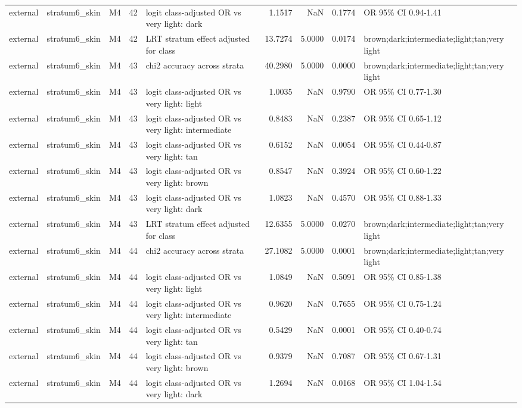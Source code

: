 \begin{tabular}{lllrlrrrl}
external & stratum6\_skin & M4 & 42 & logit class-adjusted OR vs very light: dark & 1.1517 & NaN & 0.1774 & OR 95\% CI 0.94-1.41 \\
external & stratum6\_skin & M4 & 42 & LRT stratum effect adjusted for class & 13.7274 & 5.0000 & 0.0174 & brown;dark;intermediate;light;tan;very light \\
external & stratum6\_skin & M4 & 43 & chi2 accuracy across strata & 40.2980 & 5.0000 & 0.0000 & brown;dark;intermediate;light;tan;very light \\
external & stratum6\_skin & M4 & 43 & logit class-adjusted OR vs very light: light & 1.0035 & NaN & 0.9790 & OR 95\% CI 0.77-1.30 \\
external & stratum6\_skin & M4 & 43 & logit class-adjusted OR vs very light: intermediate & 0.8483 & NaN & 0.2387 & OR 95\% CI 0.65-1.12 \\
external & stratum6\_skin & M4 & 43 & logit class-adjusted OR vs very light: tan & 0.6152 & NaN & 0.0054 & OR 95\% CI 0.44-0.87 \\
external & stratum6\_skin & M4 & 43 & logit class-adjusted OR vs very light: brown & 0.8547 & NaN & 0.3924 & OR 95\% CI 0.60-1.22 \\
external & stratum6\_skin & M4 & 43 & logit class-adjusted OR vs very light: dark & 1.0823 & NaN & 0.4570 & OR 95\% CI 0.88-1.33 \\
external & stratum6\_skin & M4 & 43 & LRT stratum effect adjusted for class & 12.6355 & 5.0000 & 0.0270 & brown;dark;intermediate;light;tan;very light \\
external & stratum6\_skin & M4 & 44 & chi2 accuracy across strata & 27.1082 & 5.0000 & 0.0001 & brown;dark;intermediate;light;tan;very light \\
external & stratum6\_skin & M4 & 44 & logit class-adjusted OR vs very light: light & 1.0849 & NaN & 0.5091 & OR 95\% CI 0.85-1.38 \\
external & stratum6\_skin & M4 & 44 & logit class-adjusted OR vs very light: intermediate & 0.9620 & NaN & 0.7655 & OR 95\% CI 0.75-1.24 \\
external & stratum6\_skin & M4 & 44 & logit class-adjusted OR vs very light: tan & 0.5429 & NaN & 0.0001 & OR 95\% CI 0.40-0.74 \\
external & stratum6\_skin & M4 & 44 & logit class-adjusted OR vs very light: brown & 0.9379 & NaN & 0.7087 & OR 95\% CI 0.67-1.31 \\
external & stratum6\_skin & M4 & 44 & logit class-adjusted OR vs very light: dark & 1.2694 & NaN & 0.0168 & OR 95\% CI 1.04-1.54 \\

\end{tabular}

